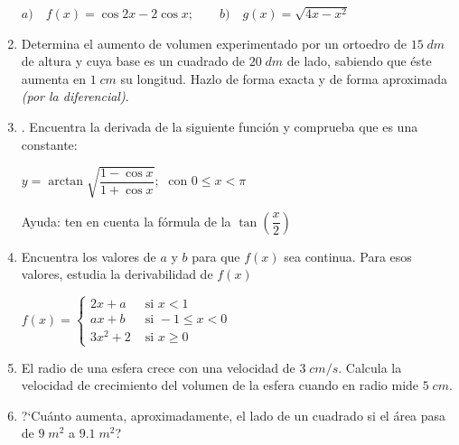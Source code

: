 \begin{enumerate}
		$a) \quad f(x)= \cos 2x - 2 \cos x; \qquad b) \quad g(x)=\sqrt{4x-x^2}$
		
		
		\item Determina el aumento de volumen experimentado por un ortoedro de $15\; dm$ de altura y cuya base es un cuadrado de $20\; dm$ de lado, sabiendo que éste aumenta en $1\; cm$ su longitud. Hazlo de forma exacta y de forma aproximada \emph{(por la diferencial)}.
		
		\rightline{\textcolor{gris}{Solución: $\Delta V=60.15\; dm^3;\quad \dd V \approx 60\; dm^3$}}
		
		\item. Encuentra la derivada de la siguiente función y comprueba que es una constante:
		
		$y= \arctan \sqrt{\dfrac {1-\cos x}{1+\cos x}};\; \mbox{ con } 0\le x < \pi$
		
		Ayuda: ten en cuenta la fórmula de la $\tan \left( \dfrac x 2 \right)$
		
		\rightline{\textcolor{gris}{Solución: $y=\dfrac x 2 \to y'=\dfrac 1 2$ }}
		
		
		\item Encuentra los valores de $a$ y $b$ para que $f(x)$ sea continua. Para esos valores, estudia la derivabilidad de $f(x)$
		
		$f(x)=
		\begin{cases}
		2x+a  & \mbox{ si } x < 1 \\
		ax+b  & \mbox{ si } -1 \le x < 0 \\
		3x^2+2  & \mbox{ si } x\ge 0 
		\end{cases} $
		
		
		\item El radio de una esfera crece con una velocidad de $3\; cm/s$. Calcula la velocidad de crecimiento del volumen de la esfera cuando en radio mide $5 \; cm$.
		
		
		\item ?`Cuánto aumenta, aproximadamente, el lado de un cuadrado si el área pasa de $9\; m^2$ a $9.1 \; m^2$?
		

\end{enumerate}
